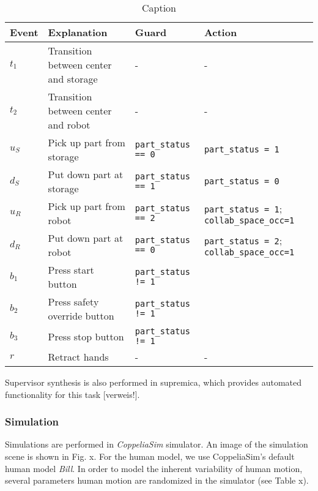 \documentclass[letterpaper, 10 pt, conference]{ieeeconf}  %
\begin{document}
\begin{table*}[]
    \centering
    \begin{tabular}{llll}
         \hline
         Event & Explanation & Guard & Action \\
         \hline
         $t_1$ & Transition between center and storage & - & -\\
         $t_2$ & Transition between center and robot & - & - \\
         $u_S$ & Pick up part from storage & \texttt{part\_status == 0} & \texttt{part\_status = 1} \\
         $d_S$ & Put down part at storage & \texttt{part\_status == 1} & \texttt{part\_status = 0}\\
         $u_R$ & Pick up part from robot& \texttt{part\_status == 2} & \texttt{part\_status = 1}; \texttt{collab\_space\_occ=1}\\
         $d_R$ & Put down part at robot& \texttt{part\_status == 0} & \texttt{part\_status = 2}; \texttt{collab\_space\_occ=1}\\
         $b_1$ & Press start button & \texttt{part\_status != 1}& \\
         $b_2$ & Press safety override button& \texttt{part\_status != 1} & \\
         $b_3$ & Press stop button & \texttt{part\_status != 1} & \\
         $r$   & Retract hands & - & - \\
         \hline
    \end{tabular}
    \caption{Caption}
    \label{tab:states_actions}
\end{table*}

Supervisor synthesis is also performed in supremica, which provides automated functionality for this task [verweis!].


\subsubsection{Simulation}
Simulations are performed in \textit{CoppeliaSim} simulator. An image of the simulation scene is shown in Fig. x. For the human model, we use CoppeliaSim's default human model \textit{Bill}. In order to model the inherent variability of human motion, several parameters human motion are randomized in the simulator (see Table x).
\end{document}
